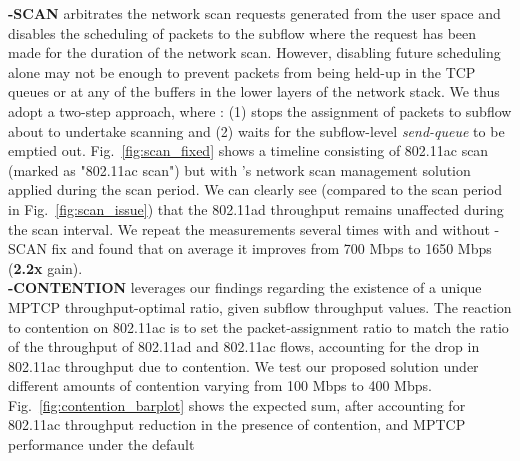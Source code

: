 \begin{figure*}[t]
    \centering
    \hfill
    \hfill
    \vspace{-0.15in}
    \caption{\name}
    \vspace{-0.1in}
\end{figure*}

\noindent\textbf{\name-SCAN} arbitrates the network scan requests generated
from the user space and disables the scheduling of packets to the
subflow where the request has been made for the duration of the
network scan. However, disabling future scheduling alone may not be
enough to prevent packets from being held-up in the TCP queues or at
any of the buffers in the lower layers of the network stack. We thus
adopt a two-step approach, where \name: (1) stops the assignment of
packets to subflow about to undertake scanning and (2) waits for the
subflow-level \emph{send-queue} to be emptied out. Fig.~\ref{fig:scan_fixed} shows 
a timeline consisting of 802.11ac scan (marked as "802.11ac scan") but with \name's 
network scan management solution applied during the scan period. We can clearly see (compared
to the scan period in Fig.~\ref{fig:scan_issue}) that the 802.11ad
throughput remains unaffected during the scan interval. We repeat the
measurements several times with and without \name-SCAN fix and found 
that on average it improves from 700 Mbps to 1650 Mbps (\textbf{2.2x} gain).
\\
\noindent\textbf{\name-CONTENTION} leverages our findings regarding the 
existence of a unique MPTCP throughput-optimal ratio, given subflow throughput values. The 
reaction to contention on 802.11ac is to set the packet-assignment ratio to match the ratio of
the throughput of 802.11ad and 802.11ac flows, accounting for the drop
in 802.11ac throughput due to contention. We test our proposed
solution under different amounts of contention varying from 100 Mbps
to 400 Mbps. Fig.~\ref{fig:contention_barplot} shows the expected sum,
after accounting for 802.11ac throughput reduction in the presence of
contention, and MPTCP performance under the default
